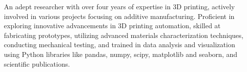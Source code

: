 


\begin{cvparagraph}

\textcolor{russell}{An adept researcher with over four years of expertise in 3D printing, actively involved in various projects focusing on additive manufacturing. Proficient in exploring innovative advancements in 3D printing automation, skilled at fabricating prototypes, utilizing advanced materials characterization techniques, conducting mechanical testing, and trained in data analysis and visualization using Python libraries like pandas, numpy, scipy, matplotlib and seaborn, and scientific publications.}
\end{cvparagraph}